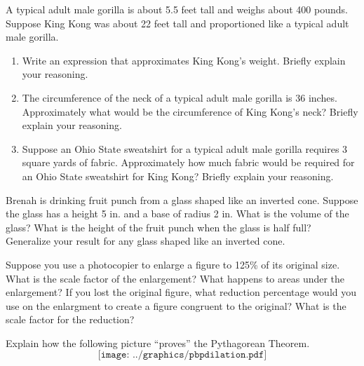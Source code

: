 \begin{prob}
A typical adult male gorilla is about 5.5 feet tall and weighs about 400 pounds. Suppose King Kong was about 22 feet tall and proportioned like a typical adult male gorilla.
\begin{enumerate}
\item Write an expression that approximates King Kong's weight. Briefly explain your reasoning.
\item The circumference of the neck of a typical adult male gorilla is 36 inches. Approximately what would be the circumference of King Kong's neck? Briefly explain your reasoning.
\item Suppose an Ohio State sweatshirt for a typical adult male gorilla requires 3 square yards of fabric.  Approximately how much fabric would be required for an Ohio State sweatshirt for King Kong?  Briefly explain your reasoning.
\end{enumerate}
\end{prob}

\begin{prob}
Brenah is drinking fruit punch from a glass shaped like an inverted cone.  Suppose the glass has a height 5 in. and a base of radius 2 in.  What is the volume of the glass?  What is the height of the fruit punch when the glass is half full?  Generalize your result for any glass shaped like an inverted cone.  
\end{prob}


\begin{prob}
Suppose you use a photocopier to enlarge a figure to 125\% of its original size.  What is the scale factor of the enlargement?  What happens to areas under the enlargement?  If you lost the original figure, what reduction percentage would you use on the enlargment to create a figure congruent to the original?  What is the scale factor for the reduction?  
\end{prob}

\begin{prob}
Explain how the following picture ``proves'' the Pythagorean Theorem.
\[
\texttt{[image: ../graphics/pbpdilation.pdf]}
\]
\end{prob}


